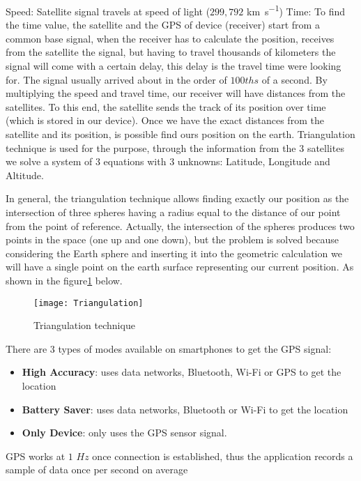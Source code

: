 \documentclass[tesi]{subfiles}
\begin{document}
Speed: Satellite signal travels at speed of light ($299,792$ \si{\km\per\second})
Time: To find the time value, the satellite and the GPS of device (receiver) start from a common base signal, when the receiver has to calculate the position, receives from the satellite the signal, but having to travel thousands of kilometers the signal will come with a certain delay, this delay is the travel time were looking for. The signal usually arrived about in the order of $100ths$ of a second.
By multiplying the speed and travel time, our receiver will have distances from the satellites. To this end, the satellite sends the track of its position over time (which is stored in our device). Once we have the exact distances from the satellite and its position, is possible find ours position on the earth. Triangulation technique is used for the purpose, through the information from the 3 satellites we solve a system of 3 equations with 3 unknowns: Latitude, Longitude and Altitude.

In general, the triangulation technique allows finding exactly our position as the intersection of three spheres having a radius equal to the distance of our point from the point of reference. Actually, the intersection of the spheres produces two points in the space (one up and one down), but the problem is solved because considering the Earth sphere and inserting it into the geometric calculation we will have a single point on the earth surface representing our current position. As shown in the figure\ref{fig:Triangulation technique} below.

\begin{figure}[H]
\centering
\texttt{[image: Triangulation]}
\caption{Triangulation technique}
\label{fig:Triangulation technique}
\end{figure}
\vspace{0.5cm}

There are 3 types of modes available on smartphones to get the GPS signal: 
\begin{itemize}
\item \textbf{High Accuracy}: uses data networks, Bluetooth, Wi-Fi or GPS to get the location
\item \textbf{Battery Saver}: uses data networks, Bluetooth or Wi-Fi to get the location
\item \textbf{Only Device}:  only uses the GPS sensor signal.
\end{itemize}

GPS works at $1$ $Hz$ once connection is established, thus the application records a sample of data once per second on average
\clearpage
\end{document}
